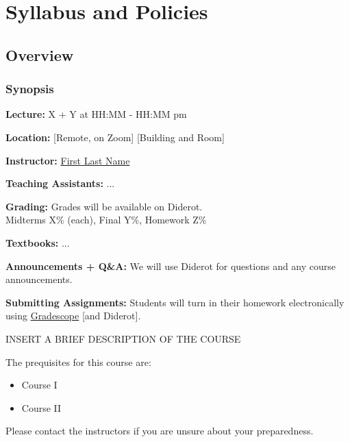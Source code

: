 \chapter{Syllabus and Policies}
\label{policies}
\begin{preamble}
\end{preamble}

\section{Overview}

\subsection{Synopsis}

\begin{gram}
\textbf{Lecture:}
X + Y at HH:MM - HH:MM pm

\textbf{Location:} 
[Remote, on Zoom] [Building and Room]

\textbf{Instructor:} 
\href{https://}{First Last Name} 

\textbf{Teaching Assistants:} ...

\textbf{Grading:} 
Grades will be available on Diderot.
\\
Midterms X\% (each), Final Y\%, Homework Z\%

\textbf{Textbooks:} 
...

\textbf{Announcements + Q\&A:} We will use Diderot for questions and any course announcements.

\textbf{Submitting Assignments:} 
Students will turn in their homework electronically using \href{https://www.gradescope.com}{Gradescope} [and Diderot].
\end{gram}


\begin{gram}
INSERT A BRIEF DESCRIPTION OF THE COURSE
\end{gram}
      
\begin{gram}
The prequisites for this course are:
          \begin{itemize}
            \item Course I
            \item Course II
            \end{itemize}

Please contact the instructors if you are unsure about your preparedness.
\end{gram}

